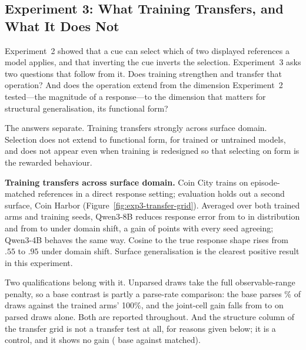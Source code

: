 \subsection{Experiment 3: What Training Transfers, and What It Does Not}
\label{sec:exp3}



Experiment~2 showed that a cue can select which of two displayed references a
model applies, and that inverting the cue inverts the selection. Experiment~3
asks two questions that follow from it. Does training strengthen and transfer
that operation? And does the operation extend from the dimension Experiment~2
tested---the magnitude of a response---to the dimension that matters for
structural generalisation, its functional form?

The answers separate. Training transfers strongly across surface domain.
Selection does not extend to functional form, for trained or untrained models,
and does not appear even when training is redesigned so that selecting on form
is the rewarded behaviour.

\textbf{Training transfers across surface domain.}
Coin City trains on episode-matched references in a direct response setting;
evaluation holds out a second surface, Coin Harbor
(Figure~\ref{fig:exp3-transfer-grid}). Averaged over both trained arms and
\eEightG{} training seeds, Qwen3-8B reduces response error from
\eEightIdBase{} to \eEightIdMatched{} in distribution and from
\eEightDomainBase{} to \eEightDomainMatched{} under domain shift, a gain of
\eEightDomainBaseGain{} points \eEightDomainBaseGainCi{} with every seed
agreeing; Qwen3-4B behaves the same way. Cosine to the true response shape rises
from $.55$ to $.95$ under domain shift. Surface generalisation is the clearest
positive result in this experiment.

Two qualifications belong with it. Unparsed draws take the full
observable-range penalty, so a base contrast is partly a parse-rate comparison:
the base parses \eEightBaseParse{}\% of draws against the trained arms' 100\%,
and the joint-cell gain falls from \eEightJointBaseGain{}
\eEightJointBaseGainCi{} to \eEightJointBaseGainParsed{}
\eEightJointBaseGainParsedCi{} on parsed draws alone. Both are reported
throughout. And the structure column of the transfer grid is not a transfer
test at all, for reasons given below; it is a control, and it shows no gain
(\eEightStructureBase{} base against \eEightStructureMatched{} matched).

